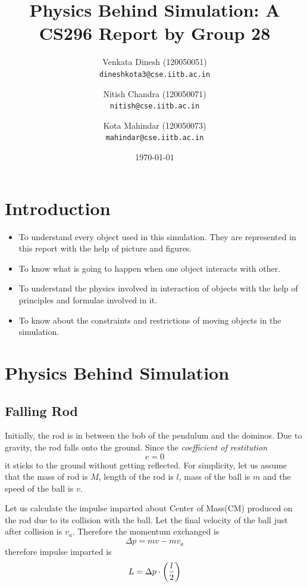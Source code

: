 \documentclass[11pt]{article}%
\title{Physics Behind Simulation: A CS296 Report by Group 28}
\author{Venkata Dinesh (120050051)\\
\texttt {dineshkota3@cse.iitb.ac.in}\and
Nitish Chandra (120050071)\\
\texttt{nitish@cse.iitb.ac.in}\and
Kota Mahindar (120050073)\\
\texttt{mahindar@cse.iitb.ac.in}
}
\begin{document}
\date{\today}
\maketitle
\section{Introduction}
\begin{itemize}
\item To understand every object used in this simulation. They are represented in this report with the help of picture and figures.
\item To know what is going to happen when one object interacts with other.
\item To understand the physics involved in interaction of objects with the help of principles and formulae involved in it.
\item To know about the constraints and restrictions of moving objects in the simulation.
\end{itemize}
\section{Physics Behind Simulation}
\subsection{Falling Rod}
Initially, the rod is in between the bob of the pendulum and the dominos. Due to gravity, the rod falls onto the ground. Since the \emph{coefficient of restitution} $$e=0$$ it sticks to the ground without getting reflected.
For simplicity, let us assume that the mass of rod is $M$, length of the rod is $l$, mass of the ball is $m$ and the speed of the ball is $v$. 

Let us calculate the impulse imparted about Center of Mass(CM) produced on the rod due to its collision with the ball. Let the final velocity of the ball just after collision is $v_a$.
Therefore the momentum exchanged is \begin{equation}\Delta p=mv-mv_a\end{equation} therefore impulse imparted is\cite{kleppner} \begin{equation} L = \Delta p\cdot \left(l\over 2\right)\end{equation}
\end{document}
